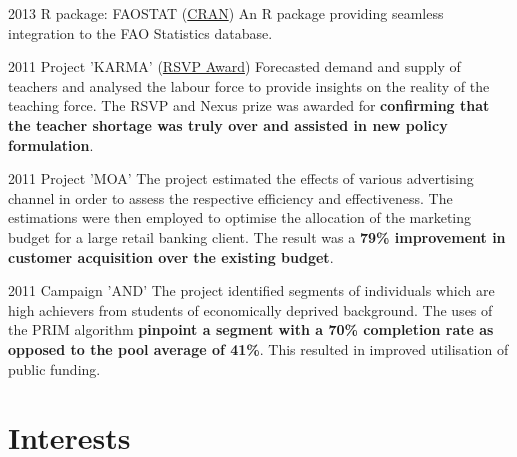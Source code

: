 \documentclass{tccv}
\begin{document}
\begin{yearlist}

\item{2013}
     {R package: FAOSTAT
       (\href{http://cran.r-project.org/web/packages/FAOSTAT/index.html}{CRAN})}
     {An R package providing seamless integration to the FAO
       Statistics database.}

\item{2011} {Project 'KARMA'
  (\href{http://nzdmawards.co.nz/winners-archive/2011-winners-gallery/ministry-of-education-what-teacher-shortage}{RSVP
    Award})} {Forecasted demand and supply of teachers and analysed
  the labour force to provide insights on the reality of the teaching
  force. The RSVP and Nexus prize was awarded for \textbf{confirming
    that the teacher shortage was truly over and assisted in new
    policy formulation}.}

\end{yearlist}
  
\begin{yearlist}
    
\item{2011} {Project 'MOA'} {The project estimated the effects of
  various advertising channel in order to assess the respective
  efficiency and effectiveness. The estimations were then employed to
  optimise the allocation of the marketing budget for a large retail
  banking client. The result was a \textbf{79\% improvement in
    customer acquisition over the existing budget}.}


\item{2011}
     {Campaign 'AND'}
     {The project identified segments of individuals which are high
       achievers from students of economically deprived
       background. The uses of the PRIM algorithm \textbf{pinpoint a
         segment with a 70\% completion rate as opposed to the pool
         average of 41\%}. This resulted in improved utilisation of
       public funding.}

\end{yearlist}


\section{Interests}
\end{document}
